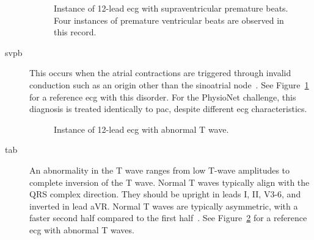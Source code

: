 \documentclass[\main/thesis.tex]{subfiles}
\begin{document}
\begin{description}
    \begin{figure}[H]
        \centering
        \caption{Instance of 12-lead \gls{ecg} with supraventricular premature beats. Four instances of premature ventricular beats are observed in this record.}
        \label{fig:full_SVPB}
    \end{figure}
    \item[\gls{svpb}] This occurs when the atrial contractions are triggered through invalid conduction such as an origin other than the sinoatrial node~\cite{GOLDBERGER2018130}.
    See Figure~\ref{fig:full_SVPB} for a reference \gls{ecg} with this disorder.
    For the PhysioNet challenge, this diagnosis is treated identically to \gls{pac}, despite different \gls{ecg} characteristics.

    \begin{figure}[H]
        \centering
        \caption{Instance of 12-lead \gls{ecg} with abnormal T wave.}
        \label{fig:full_TAb}
    \end{figure}
    \item[\gls{tab}]
    An abnormality in the T wave ranges from low T-wave amplitudes to complete inversion of the T wave. Normal T waves typically align with the QRS complex direction. They should be upright in leads I, II, V3-6, and inverted in lead aVR. Normal T waves are typically asymmetric, with a faster second half compared to the first half~\cite{ecg-utah-lesson}.
    See Figure~\ref{fig:full_TAb} for a reference \gls{ecg} with abnormal T waves.


\end{description}
\end{document}
